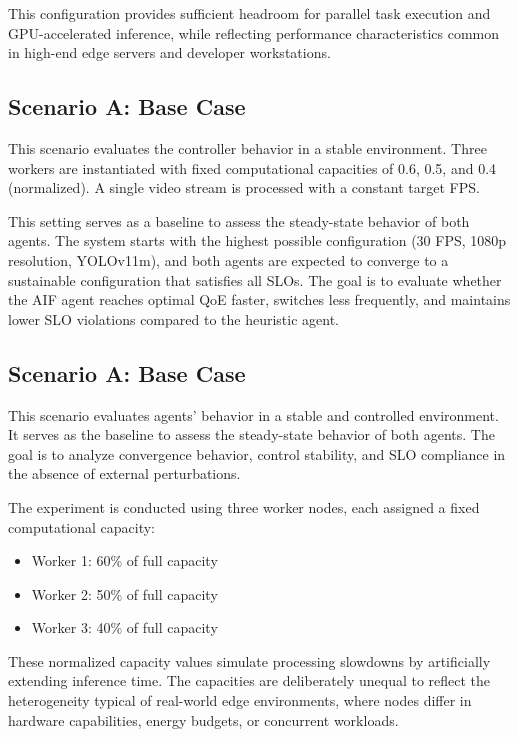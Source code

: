 This configuration provides sufficient headroom for parallel task execution and GPU-accelerated inference, while reflecting performance characteristics common in high-end edge servers and developer workstations.

\subsection{Scenario A: Base Case}
\label{sec:evaluation-base}

This scenario evaluates the controller behavior in a stable environment. Three workers are instantiated with fixed computational capacities of 0.6, 0.5, and 0.4 (normalized). A single video stream is processed with a constant target FPS.

This setting serves as a baseline to assess the steady-state behavior of both agents. The system starts with the highest possible configuration (30 FPS, 1080p resolution, YOLOv11m), and both agents are expected to converge to a sustainable configuration that satisfies all SLOs. The goal is to evaluate whether the AIF agent reaches optimal QoE faster, switches less frequently, and maintains lower SLO violations compared to the heuristic agent.



\subsection{Scenario A: Base Case}
\label{sec:evaluation-base}

This scenario evaluates agents' behavior in a stable and controlled environment. It serves as the baseline to assess the steady-state behavior of both agents. The goal is to analyze convergence behavior, control stability, and SLO compliance in the absence of external perturbations.

The experiment is conducted using three worker nodes, each assigned a fixed computational capacity:
\begin{itemize}
    \item Worker 1: 60\% of full capacity
    \item Worker 2: 50\% of full capacity
    \item Worker 3: 40\% of full capacity
\end{itemize}

These normalized capacity values simulate processing slowdowns by artificially extending inference time. The capacities are deliberately unequal to reflect the heterogeneity typical of real-world edge environments, where nodes differ in hardware capabilities, energy budgets, or concurrent workloads.

